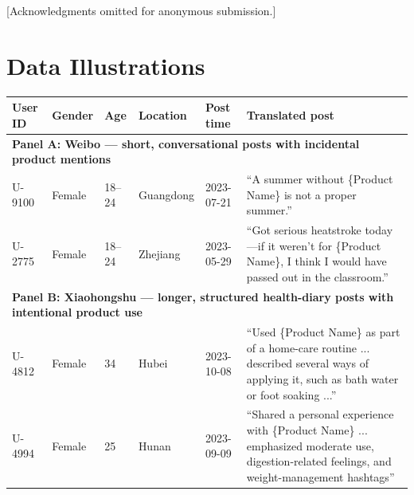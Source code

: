 \documentclass{article}
\begin{document}
\begin{ack}
[Acknowledgments omitted for anonymous submission.]
\end{ack}




\appendix

\section{Data Illustrations}
\label{app:tables}

\begin{table}[htb!]
\centering
\small
\begin{tabular}{p{}p{}p{}p{}p{}p{}}
\toprule
User ID & Gender & Age & Location & Post time & Translated post \\
\midrule
\multicolumn{6}{l}{\textbf{Panel A: Weibo --- short, conversational posts with incidental product mentions}} \\
\midrule

U-9100 & Female & 18--24 & Guangdong & 2023-07-21 &
``A summer without \{Product Name\} is not a proper summer.'' \\[3pt]

U-2775 & Female & 18--24 & Zhejiang & 2023-05-29 &
``Got serious heatstroke today---if it weren't for \{Product Name\},
I think I would have passed out in the classroom.'' \\[3pt]

\midrule
\multicolumn{6}{l}{\textbf{Panel B: Xiaohongshu --- longer, structured health-diary posts with intentional product use}} \\
\midrule

U-4812 & Female & 34 & Hubei & 2023-10-08 &
``Used \{Product Name\} as part of a home-care routine ... described
several ways of applying it, such as bath water or foot soaking ...'' \\[3pt]

U-4994 & Female & 25 & Hunan & 2023-09-09 &
``Shared a personal experience with \{Product Name\} ... emphasized
moderate use, digestion-related feelings, and weight-management hashtags'' \\[3pt]


\end{tabular}
\end{table}
\end{document}
